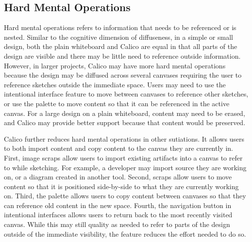 
%


\subsection{Hard Mental Operations}

Hard mental operations refers to information that needs to be referenced or is nested. Similar to the cognitive dimension of diffuseness, in a simple or small design, both the plain whiteboard and Calico are equal in that all parts of the design are visible and there may be little need to reference outside information. However, in larger projects, Calico may have more hard mental operations because the design may be diffused across several canvases requiring the user to reference sketches outside the immediate space. Users may need to use the intentional interface feature to move between canvases to reference other sketches, or use the palette to move content so that it can be referenced in the active canvas. For a large design on a plain whiteboard, content may need to be erased, and Calico may provide better support because that content would be preserved.

Calico further reduces hard mental operations in other sutiations. It allows users to both import content and copy content to the canvas they are currently in. First, image scraps allow users to import existing artifacts into a canvas to refer to while sketching. For example, a developer may import source they are working on, or a diagram created in another tool. Second, scraps allow users to move content so that it is positioned side-by-side to what they are currently working on. Third, the palette allows users to copy content between canvases so that they can reference old content in the new space. Fourth, the navigation button in intentional interfaces allows users to return back to the most recently visited canvas. While this may still quality as needed to refer to parts of the design outside of the immediate visibility, the feature reduces the effort needed to do so.

